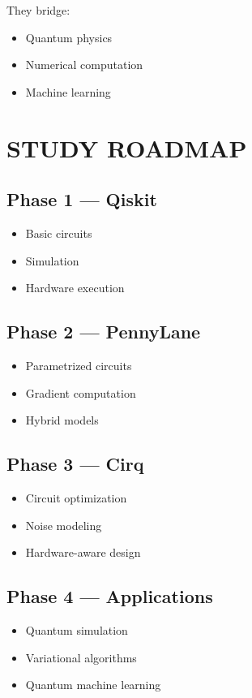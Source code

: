 They bridge:
\begin{itemize}
\item Quantum physics
\item Numerical computation
\item Machine learning
\end{itemize}

\vspace{0.5cm}

\section*{STUDY ROADMAP}

\subsection*{Phase 1 --- Qiskit}
\begin{itemize}
\item Basic circuits
\item Simulation
\item Hardware execution
\end{itemize}

\subsection*{Phase 2 --- PennyLane}
\begin{itemize}
\item Parametrized circuits
\item Gradient computation
\item Hybrid models
\end{itemize}

\subsection*{Phase 3 --- Cirq}
\begin{itemize}
\item Circuit optimization
\item Noise modeling
\item Hardware-aware design
\end{itemize}

\subsection*{Phase 4 --- Applications}
\begin{itemize}
\item Quantum simulation
\item Variational algorithms
\item Quantum machine learning
\end{itemize}